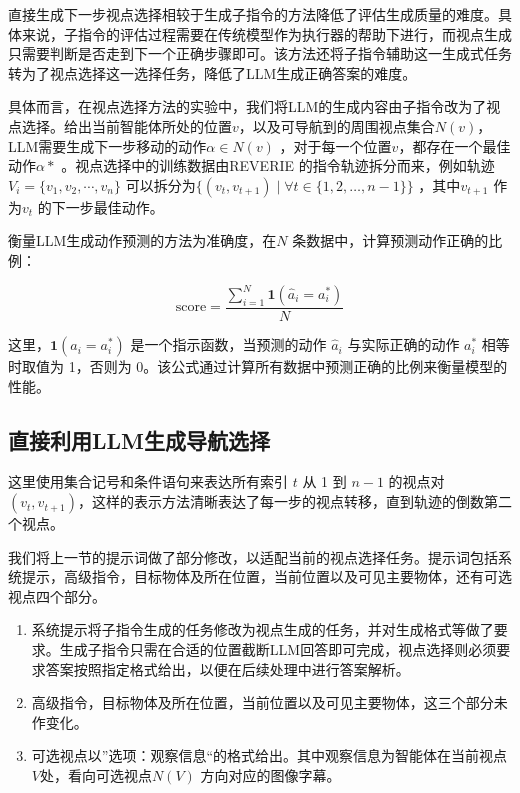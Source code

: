 \documentclass[bachelor]{thesis-uestc}
\begin{document}
直接生成下一步视点选择相较于生成子指令的方法降低了评估生成质量的难度。具体来说，子指令的评估过程需要在传统模型作为执行器的帮助下进行，而视点生成只需要判断是否走到下一个正确步骤即可。该方法还将子指令辅助这一生成式任务转为了视点选择这一选择任务，降低了LLM生成正确答案的难度。

具体而言，在视点选择方法的实验中，我们将LLM的生成内容由子指令改为了视点选择。给出当前智能体所处的位置$v$，以及可导航到的周围视点集合$N(v)$，LLM需要生成下一步移动的动作$\alpha \in N(v)$ ，对于每一个位置$v$，都存在一个最佳动作$\alpha*$ 。视点选择中的训练数据由REVERIE 的指令轨迹拆分而来，例如轨迹 $V_i=\{v_1,v_2,\cdots,v_n\}$ 可以拆分为$\{(v_t, v_{t+1}) \mid \forall t \in \{1, 2, \dots, n-1\}\}$ ，其中$v_{t+1}$ 作为$v_t$ 的下一步最佳动作。

衡量LLM生成动作预测的方法为准确度，在$N$ 条数据中，计算预测动作正确的比例：

\[
\text{score} = \frac{\sum_{i=1}^N \mathbf{1}(\hat{a}_i = a^*_i)}{N}
\]

这里，$\mathbf{1}(\hat{a}_i = a^*_i)$ 是一个指示函数，当预测的动作 $\hat{a}_i$ 与实际正确的动作 $a^*_i$ 相等时取值为 1，否则为 0。该公式通过计算所有数据中预测正确的比例来衡量模型的性能。


\subsection{直接利用LLM生成导航选择}

这里使用集合记号和条件语句来表达所有索引 \( t \) 从 1 到 \( n-1 \) 的视点对 \( (v_t, v_{t+1}) \)，这样的表示方法清晰表达了每一步的视点转移，直到轨迹的倒数第二个视点。

我们将上一节的提示词做了部分修改，以适配当前的视点选择任务。提示词包括系统提示，高级指令，目标物体及所在位置，当前位置以及可见主要物体，还有可选视点四个部分。

\begin{enumerate}
    \item 系统提示将子指令生成的任务修改为视点生成的任务，并对生成格式等做了要求。生成子指令只需在合适的位置截断LLM回答即可完成，视点选择则必须要求答案按照指定格式给出，以便在后续处理中进行答案解析。
    \item 高级指令，目标物体及所在位置，当前位置以及可见主要物体，这三个部分未作变化。
    \item 可选视点以”选项：观察信息“的格式给出。其中观察信息为智能体在当前视点$V$处，看向可选视点$N(V)$ 方向对应的图像字幕。
\end{enumerate}
\end{document}
